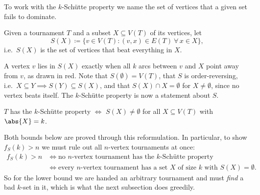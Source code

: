 To work with the \(k\)-Sch\"utte property we name the set of vertices that a given set fails to dominate.

\begin{notation}
    Given a tournament \(T\) and a subset \(X \subseteq V(T)\) of its vertices, let
    \[
        S(X) \coloneqq \{ v \in V(T) : (v, x) \in E(T) \ \forall\, x \in X \},
    \]
    i.e.\ \(S(X)\) is the set of vertices that beat everything in \(X\).
\end{notation}

\begin{center}
\end{center}

A vertex \(v\) lies in \(S(X)\) exactly when all \(k\) arcs between \(v\) and \(X\) point away from \(v\), as drawn in red. Note that \(S(\emptyset) = V(T)\), that \(S\) is order-reversing, i.e.\ \(X \subseteq Y \implies S(Y) \subseteq S(X)\), and that \(S(X) \cap X = \emptyset\) for \(X \ne \emptyset\), since no vertex beats itself. The \(k\)-Sch\"utte property is now a statement about \(S\).

\begin{lemma}\label{lem:schutte-S}
    \(T\) has the \(k\)-Sch\"utte property \(\iff\) \(S(X) \ne \emptyset\) for all \(X \subseteq V(T)\) with \(\abs{X} = k\).
\end{lemma}

Both bounds below are proved through this reformulation. In particular, to show \(f_S(k) > n\) we must rule out all \(n\)-vertex tournaments at once:
\begin{align*}
    f_S(k) > n
    &\iff \text{no \(n\)-vertex tournament has the \(k\)-Sch\"utte property} \\
    &\iff \text{every \(n\)-vertex tournament has a set \(X\) of size \(k\) with \(S(X) = \emptyset\).}
\end{align*}
So for the lower bound we are handed an arbitrary tournament and must \emph{find} a bad \(k\)-set in it, which is what the next subsection does greedily.

